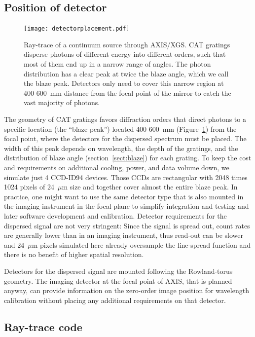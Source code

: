 \documentclass[12pt]{spieman}  %
\begin{document}
\begin{spacing}{1}
\subsection{Position of detector}
\label{sect:detpos}
\begin{figure} [ht]
\begin{center}
\texttt{[image: detectorplacement.pdf]}
\end{center}
\caption {\label{fig:det}
Ray-trace of a continuum source through AXIS/XGS. CAT gratings disperse photons of different energy into different orders, such that most of them end up in a narrow range of angles. The photon distribution has a clear peak at twice the blaze angle, which we call the blaze peak. Detectors only need to cover this narrow region at 400-600~mm distance from the focal point of the mirror to catch the vast majority of photons.
}
\end{figure}
The geometry of CAT gratings favors diffraction orders that direct photons to a specific location (the ``blaze peak'') located 400-600~mm (Figure~\ref{fig:det}) from the focal point, where the detectors for the dispersed spectrum must be placed. The width of this peak depends on wavelength, the depth of the gratings, and the distribution of blaze angle (section~\ref{sect:blaze}) for each grating. To keep the cost and requirements on additional cooling, power, and data volume down, we simulate just 4 CCD-ID94 devices. Those CCDs are rectangular with 2048 times 1024 pixels of 24~$\mu$m size and together cover almost the entire blaze peak. In practice, one might want to use the same detector type that is also mounted in the imaging instrument in the focal plane to simplify integration and testing and later software development and calibration. Detector requirements for the dispersed signal are not very stringent: Since the signal is spread out, count rates are generally lower than in an imaging instrument, thus read-out can be slower and  24~$\mu$m pixels simulated here already oversample the line-spread function and there is no benefit of higher spatial resolution.

Detectors for the dispersed signal are mounted following the Rowland-torus geometry. The imaging detector at the focal point of AXIS, that is planned anyway, can provide information on the zero-order image position for wavelength calibration without placing any additional requirements on that detector.

\subsection{Ray-trace code}
\label{sect:raytrace}


\end{spacing}
\end{document}
